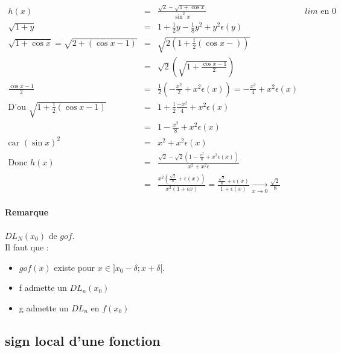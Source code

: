 \[\begin{array}{rclr}
h(x) &=& \frac{\sqrt{2} - \sqrt{1+\cos x}}{\sin^2 x} & lim \text{ en } 0 \\
\sqrt{1+y} &=& 1 + \frac{1}{2} y - \frac{1}{8}y^2 + y^2 \epsilon (y) \\
\sqrt{1 + \cos x} = \sqrt{2+(\cos x - 1)} &=& \sqrt{2(1 + \frac{1}{2}(\cos x -))}\\
&=& \sqrt{2}(\sqrt{1+\frac{\cos x - 1}{2}}) \\
\frac{\cos x -1}{2} &=& \frac{1}{2}(-\frac{x^2}{2} + x^2 \epsilon (x)) = - \frac{x^2}{4} + x^2 \epsilon (x) \\
\text{D'ou } \sqrt{1+\frac{1}{2}(\cos x - 1)} &=& 1 + \frac{1}{2}\frac{-x^2}{4} + x^2 \epsilon (x) \\
&=& 1 - \frac{x^2}{8} + x^2 \epsilon (x) \\
\text{car } (\sin x)^2 &=& x^2 + x^2 \epsilon (x) \\
\text{Donc } h(x) &=& \frac{\sqrt{2} - \sqrt{2}(1-\frac{x^2}{8} + x^2 \epsilon (x))}{x^2 + x^2 \epsilon} \\
&=& \frac{x^2(\frac{\sqrt{2}}{8} + \epsilon (x))}{x^2(1+\epsilon x)} = \frac{\frac{\sqrt{2}}{8} + \epsilon (x)}{1+\epsilon (x)} \xrightarrow[x \to 0]{} \frac{\sqrt{2}}{8}
\end{array}\]

\paragraph{Remarque} $DL_N(x_0)$ de $gof$. ~\\
Il faut que :
\begin{itemize}
	\item $gof(x)$ existe pour $x \in ]x_0 - \delta; x + \delta[$. ~\\
	\item f admette un $DL_n(x_0)$
	\item g admette un $DL_n$ en $f(x_0)$
\end{itemize}

\subsection{sign local d'une fonction}
